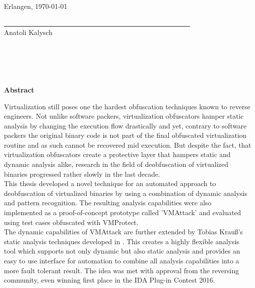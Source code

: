 \documentclass[10pt,twoside,a4paper,bibliography=totoc]{scrbook}
\newcommand{\echoName}[1]{Anatoli Kalysch}
\newcommand{\echoOther}[1]{Tobias Krau{\ss}}
\begin{document}
Erlangen, \today
\begin{flushright}
	\underline{\ \ \ \ \ \ \ \ \ \ \ \ \ \ \ \ \ \ \ \ \ \ \ \ \ 
		\ \ \ \ \ \ \ \ \ \ \ \ \ \ \ \ \ \ \ \ \ \ \ \ \ \ \ \ \ 
	} \\
	\small{\echoName\\}
\end{flushright}

%
% 

\chapter*{\ }

\vspace{2em}
\begin{center}
	\begin{large}
		\textbf{Abstract}
	\end{large}
\end{center}
\vspace{0.75em}
Virtualization still poses one the hardest obfuscation techniques known to reverse engineers. Not unlike software packers, virtualization obfuscators hamper static analysis by changing the execution flow drastically and yet, contrary to software packers the original binary code is not part of the final obfuscated virtualization routine and as such cannot be recovered mid execution. But despite the fact, that virtualization obfuscators create a protective layer that hampers static and dynamic analysis alike, research in the field of deobfuscation of virtualized binaries progressed rather slowly in the last decade. \\
This thesis developed a novel technique for an automated approach to deobfuscation of virtualized binaries by using a combination of dynamic analysis and pattern recognition. The resulting analysis capabilities were also implemented as a proof-of-concept prototype called 'VMAttack' and evaluated using test cases obfuscated with VMProtect.\\
The dynamic capabilities of VMAttack are further extended by \echoOther{}'s static analysis techniques developed in \cite{Krau:Thesis2016}. This creates a highly flexible analysis tool which supports not only dynamic but also static analysis and provides an easy to use interface for automation to combine all analysis capabilities into a more fault tolerant result. The idea was met with approval from the reversing community, even winning first place in the IDA Plug-in Contest 2016.\\
\newline
\end{document}
